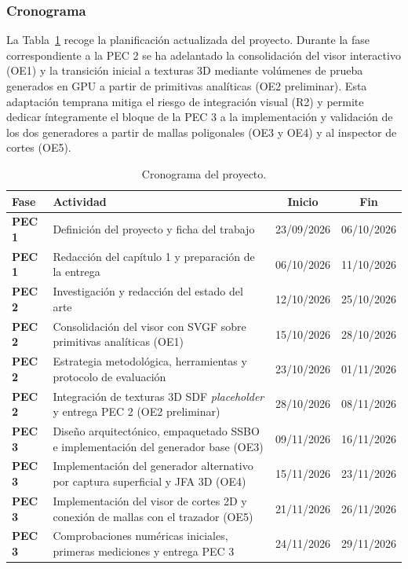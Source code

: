 \subsubsection{Cronograma}

La Tabla~\ref{tab:cronograma} recoge la planificación actualizada del proyecto. Durante la fase correspondiente a la PEC 2 se ha adelantado la consolidación del visor interactivo (OE1) y la transición inicial a texturas 3D mediante volúmenes de prueba generados en GPU a partir de primitivas analíticas (OE2 preliminar). Esta adaptación temprana mitiga el riesgo de integración visual (R2) y permite dedicar íntegramente el bloque de la PEC 3 a la implementación y validación de los dos generadores a partir de mallas poligonales (OE3 y OE4) y al inspector de cortes (OE5).

\begin{table}[htbp]
  \centering
  \small
  \caption{Cronograma del proyecto.}
  \label{tab:cronograma}
  \begin{tabularx}{\textwidth}{|>{\bfseries}l|X|c|c|}
    \hline
    \rowcolor{tablegray} Fase & Actividad & Inicio & Fin \\ \hline
    PEC 1 & Definición del proyecto y ficha del trabajo & 23/09/2026 & 06/10/2026 \\ \hline
    PEC 1 & Redacción del capítulo 1 y preparación de la entrega & 06/10/2026 & 11/10/2026 \\ \hline
    PEC 2 & Investigación y redacción del estado del arte & 12/10/2026 & 25/10/2026 \\ \hline
    PEC 2 & Consolidación del visor con SVGF sobre primitivas analíticas (OE1) & 15/10/2026 & 28/10/2026 \\ \hline
    PEC 2 & Estrategia metodológica, herramientas y protocolo de evaluación & 23/10/2026 & 01/11/2026 \\ \hline
    PEC 2 & Integración de texturas 3D SDF \textit{placeholder} y entrega PEC 2 (OE2 preliminar) & 28/10/2026 & 08/11/2026 \\ \hline
    PEC 3 & Diseño arquitectónico, empaquetado SSBO e implementación del generador base (OE3) & 09/11/2026 & 16/11/2026 \\ \hline
    PEC 3 & Implementación del generador alternativo por captura superficial y JFA 3D (OE4) & 15/11/2026 & 23/11/2026 \\ \hline
    PEC 3 & Implementación del visor de cortes 2D y conexión de mallas con el trazador (OE5) & 21/11/2026 & 26/11/2026 \\ \hline
    PEC 3 & Comprobaciones numéricas iniciales, primeras mediciones y entrega PEC 3 & 24/11/2026 & 29/11/2026 \\ \hline

\end{tabularx}
\end{table}
